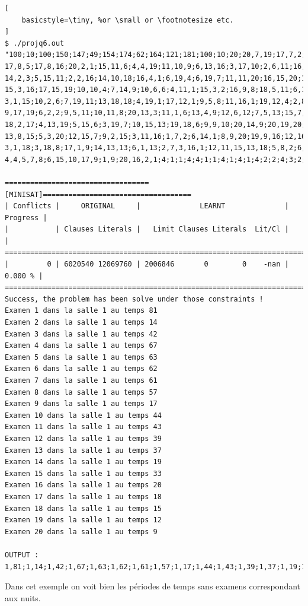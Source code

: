 \documentclass[a4paper,11pt]{article}
\begin{document}
\begin{lstlisting}[
    basicstyle=\tiny, %or \small or \footnotesize etc.
]
$ ./projq6.out "100;10;100;150;147;49;154;174;62;164;121;181;100;10;20;20,7,19;17,7,2;10,11,15;13,4,19;6,9,11;
17,8,5;17,8,16;20,2,1;15,11,6;4,4,19;11,10,9;6,13,16;3,17,10;2,6,11;16,19,12;5,13,9;20,11,15;7,9,13;
14,2,3;5,15,11;2,2,16;14,10,18;16,4,1;6,19,4;6,19,7;11,11,20;16,15,20;14,20,8;13,20,9;8,6,6;4,17,7;
15,3,16;17,15,19;10,10,4;7,14,9;10,6,6;4,11,1;15,3,2;16,9,8;18,5,11;6,18,20;13,13,3;1,10,1;15,6,19;
3,1,15;10,2,6;7,19,11;13,18,18;4,19,1;17,12,1;9,5,8;11,16,1;19,12,4;2,8,2;6,14,6;10,13,6;11,14,10;
9,17,19;6,2,2;9,5,11;10,11,8;20,13,3;11,1,6;13,4,9;12,6,12;7,5,13;15,7,2;17,18,13;13,8,9;7,16,3;
18,2,17;4,13,19;5,15,6;3,19,7;10,15,13;19,18,6;9,9,10;20,14,9;20,19,20;17,4,1;4,12,18;17,11,15;
13,8,15;5,3,20;12,15,7;9,2,15;3,11,16;1,7,2;6,14,1;8,9,20;19,9,16;12,16,16;5,15,9;20,19,16;4,20,20;
3,1,18;3,18,8;17,1,9;14,13,13;6,1,13;2,7,3,16,1;12,11,15,13,18;5,8,2;6,6,19,20,10;5;14,1,20,5;
4,4,5,7,8;6,15,10,17,9;1,9;20,16,2,1;4;1;1;4;4;1;1;4;1;4;1;4;2;2;4;3;2;3;3;3;"

==================================[MINISAT]===================================
| Conflicts |     ORIGINAL     |              LEARNT              | Progress |
|           | Clauses Literals |   Limit Clauses Literals  Lit/Cl |          |
==============================================================================
|         0 | 6020540 12069760 | 2006846       0        0    -nan |  0.000 % |
==============================================================================
Success, the problem has been solve under those constraints !
Examen 1 dans la salle 1 au temps 81
Examen 2 dans la salle 1 au temps 14
Examen 3 dans la salle 1 au temps 42
Examen 4 dans la salle 1 au temps 67
Examen 5 dans la salle 1 au temps 63
Examen 6 dans la salle 1 au temps 62
Examen 7 dans la salle 1 au temps 61
Examen 8 dans la salle 1 au temps 57
Examen 9 dans la salle 1 au temps 17
Examen 10 dans la salle 1 au temps 44
Examen 11 dans la salle 1 au temps 43
Examen 12 dans la salle 1 au temps 39
Examen 13 dans la salle 1 au temps 37
Examen 14 dans la salle 1 au temps 19
Examen 15 dans la salle 1 au temps 33
Examen 16 dans la salle 1 au temps 20
Examen 17 dans la salle 1 au temps 18
Examen 18 dans la salle 1 au temps 15
Examen 19 dans la salle 1 au temps 12
Examen 20 dans la salle 1 au temps 9
 
OUTPUT : 1,81;1,14;1,42;1,67;1,63;1,62;1,61;1,57;1,17;1,44;1,43;1,39;1,37;1,19;1,33;1,20;1,18;1,15;1,12;1,9;
\end{lstlisting}
Dans cet exemple on voit bien les périodes de temps sans examens correspondant aux nuits.
\end{document}
